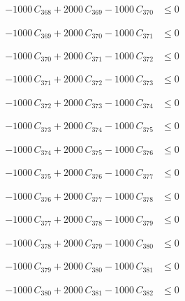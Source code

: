 \documentclass[a4paper,11pt]{article}
\begin{document}
\begin{align}
-1000\,C_{368} + 2000\,C_{369} - 1000\,C_{370} &\leq 0 \nonumber
\end{align}

\begin{align}
-1000\,C_{369} + 2000\,C_{370} - 1000\,C_{371} &\leq 0 \nonumber
\end{align}

\begin{align}
-1000\,C_{370} + 2000\,C_{371} - 1000\,C_{372} &\leq 0 \nonumber
\end{align}

\begin{align}
-1000\,C_{371} + 2000\,C_{372} - 1000\,C_{373} &\leq 0 \nonumber
\end{align}

\begin{align}
-1000\,C_{372} + 2000\,C_{373} - 1000\,C_{374} &\leq 0 \nonumber
\end{align}

\begin{align}
-1000\,C_{373} + 2000\,C_{374} - 1000\,C_{375} &\leq 0 \nonumber
\end{align}

\begin{align}
-1000\,C_{374} + 2000\,C_{375} - 1000\,C_{376} &\leq 0 \nonumber
\end{align}

\begin{align}
-1000\,C_{375} + 2000\,C_{376} - 1000\,C_{377} &\leq 0 \nonumber
\end{align}

\begin{align}
-1000\,C_{376} + 2000\,C_{377} - 1000\,C_{378} &\leq 0 \nonumber
\end{align}

\begin{align}
-1000\,C_{377} + 2000\,C_{378} - 1000\,C_{379} &\leq 0 \nonumber
\end{align}

\begin{align}
-1000\,C_{378} + 2000\,C_{379} - 1000\,C_{380} &\leq 0 \nonumber
\end{align}

\begin{align}
-1000\,C_{379} + 2000\,C_{380} - 1000\,C_{381} &\leq 0 \nonumber
\end{align}

\begin{align}
-1000\,C_{380} + 2000\,C_{381} - 1000\,C_{382} &\leq 0 \nonumber
\end{align}
\end{document}
